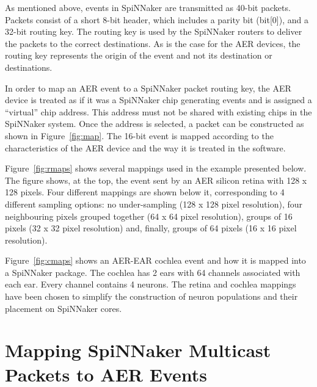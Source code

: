 

As mentioned above, events in SpiNNaker are transmitted as 40-bit packets. Packets consist of a short 8-bit header, which includes a parity bit (bit[0]), and a 32-bit routing key. The routing key is used by the SpiNNaker routers to deliver the packets to the correct destinations. As is the case for the AER devices, the routing key represents the origin of the event and not its destination or destinations.

In order to map an AER event to a SpiNNaker packet routing key, the AER device is treated as if it was a SpiNNaker chip generating events and is assigned a ``virtual'' chip address. This address must not be shared with existing chips in the SpiNNaker system. Once the address is selected, a packet can be constructed as shown in Figure~\ref{fig:map}. The 16-bit event is mapped according to the characteristics of the AER device and the way it is treated in the software.\\




Figure~\ref{fig:rmaps} shows several mappings used in the example presented below.
The figure shows, at the top, the event sent by an AER silicon retina with 128 x 128 pixels. Four different mappings are shown below it, corresponding to 4 different sampling options: no under-sampling (128 x 128 pixel resolution), four neighbouring pixels grouped together (64 x 64 pixel resolution), groups of 16 pixels (32 x 32 pixel resolution) and, finally, groups of 64 pixels (16 x 16 pixel resolution).\\




Figure~\ref{fig:cmaps} shows an AER-EAR cochlea event and how it is mapped into a SpiNNaker package. The cochlea has 2 ears with 64 channels associated with each ear. Every channel contains 4 neurons. The retina and cochlea mappings have been chosen to simplify the construction of neuron populations and their placement on SpiNNaker cores.



\section{Mapping SpiNNaker Multicast Packets to AER Events}


